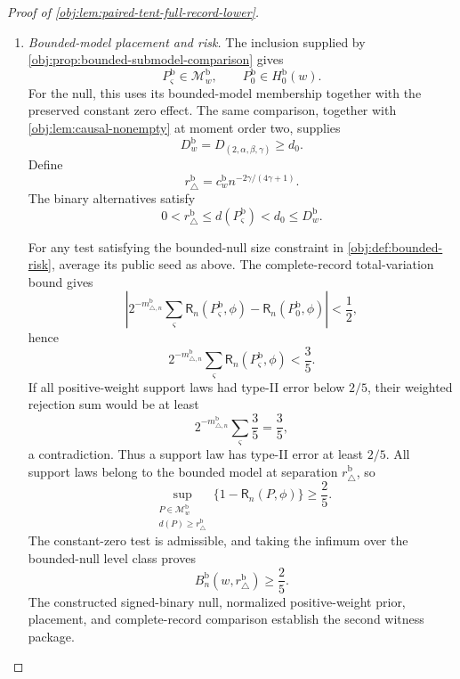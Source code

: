 \begin{proof}[Proof of \cref{obj:lem:paired-tent-full-record-lower}]
\begin{enumerate}
\item \emph{Bounded-model placement and risk.}
The inclusion supplied by \cref{obj:prop:bounded-submodel-comparison} gives
\[
P_\varsigma^{\mathrm b}\in\mathcal M_w^{\mathrm b},
\qquad
P_0^{\mathrm b}\in H_0^{\mathrm b}(w).
\]
For the null, this uses its bounded-model membership together with the
preserved constant zero effect. The same comparison, together with
\cref{obj:lem:causal-nonempty} at moment order two, supplies
\[
D_w^{\mathrm b}=D_{(2,\alpha,\beta,\gamma)}\ge d_0.
\]
Define
\[
r_\triangle^{\mathrm b}
=c_w^{\mathrm b}n^{-2\gamma/(4\gamma+1)}.
\]
The binary alternatives satisfy
\[
0<r_\triangle^{\mathrm b}
\le d(P_\varsigma^{\mathrm b})<d_0\le D_w^{\mathrm b}.
\]

For any test satisfying the bounded-null size constraint in
\cref{obj:def:bounded-risk}, average its public seed as above. The
complete-record total-variation bound gives
\[
\left|
2^{-m_{\triangle,n}^{\mathrm b}}\sum_\varsigma
\mathsf R_n(P_\varsigma^{\mathrm b},\phi)
-\mathsf R_n(P_0^{\mathrm b},\phi)
\right|<\frac12,
\]
hence
\[
2^{-m_{\triangle,n}^{\mathrm b}}\sum_\varsigma
\mathsf R_n(P_\varsigma^{\mathrm b},\phi)<\frac35.
\]
If all positive-weight support laws had type-II error below \(2/5\), their
weighted rejection sum would be at least
\[
2^{-m_{\triangle,n}^{\mathrm b}}\sum_\varsigma\frac35=\frac35,
\]
a contradiction. Thus a support law has type-II error at least \(2/5\).
All support laws belong to the bounded model at separation
\(r_\triangle^{\mathrm b}\), so
\[
\sup_{\substack{P\in\mathcal M_w^{\mathrm b}\\
d(P)\ge r_\triangle^{\mathrm b}}}
\{1-\mathsf R_n(P,\phi)\}\ge\frac25.
\]
The constant-zero test is admissible, and taking the infimum over the
bounded-null level class proves
\[
B_n^{\mathrm b}(w,r_\triangle^{\mathrm b})\ge\frac25.
\]
The constructed signed-binary null, normalized positive-weight prior,
placement, and complete-record comparison establish the second witness
package.
\end{enumerate}
\end{proof}
